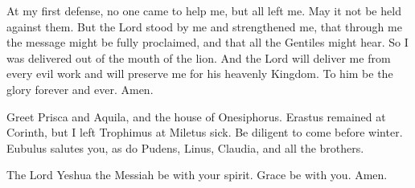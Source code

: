 \myverse{}At my first defense, no one came to help me, but all left me. May it not be held against them. \myverse{}But the Lord stood by me and strengthened me, that through me the message might be fully proclaimed, and that all the Gentiles might hear. So I was delivered out of the mouth of the lion. \myverse{}And the Lord will deliver me from every evil work and will preserve me for his heavenly Kingdom. To him be the glory forever and ever. Amen.


\myverse{}Greet Prisca and Aquila, and the house of Onesiphorus. \myverse{}Erastus remained at Corinth, but I left Trophimus at Miletus sick. \myverse{}Be diligent to come before winter. Eubulus salutes you, as do Pudens, Linus, Claudia, and all the brothers.


\myverse{}The Lord Yeshua the Messiah be with your spirit. Grace be with
you. Amen.


